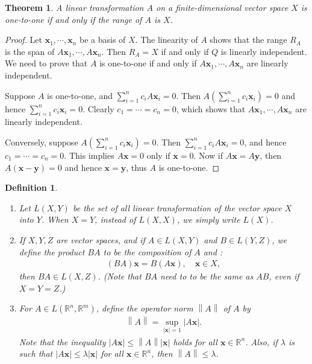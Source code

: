 \documentclass[10pt]{book}
\newtheorem{definition}{Definition}[chapter]
\newtheorem{theorem}{Theorem}[chapter]
\theoremstyle{definition}
\numberwithin{equation}{chapter}
\begin{document}
\medskip

\begin{theorem}\label{th_71}
A linear transformation $A$ on a finite-dimensional vector space $X$ is one-to-one if and only if the range of $A$ is $X$.
\end{theorem}
\begin{proof}
Let $\mathbf{x}_1, \cdots, \mathbf{x}_n$ be a basis of $X$. The linearity of $A$ shows that the range $R_A$ is the span of $A\mathbf{x}_1, \cdots, A\mathbf{x}_n$. Then $R_A = X$ if and only if $Q$ is linearly independent. We need to prove that $A$ is one-to-one if and only if $A\mathbf{x}_1, \cdots, A\mathbf{x}_n$ are linearly independent.

Suppose $A$ is one-to-one, and $\sum^n_{i=1} c_i A \mathbf{x}_i = 0$. Then $A \left(\sum^n_{i=1} c_i \mathbf{x}_i\right) = 0$ and hence $\sum^n_{i=1} c_i \mathbf{x}_i = 0$. Clearly $c_1 = \cdots = c_n = 0$, which shows that $A\mathbf{x}_1, \cdots, A\mathbf{x}_n$ are linearly independent.

Conversely, suppose $A \left(\sum^n_{i=1} c_i \mathbf{x}_i\right) = 0$. Then $\sum^n_{i=1} c_i A \mathbf{x}_i = 0$, and hence $c_1 = \cdots = c_n = 0$. This implies $A\mathbf{x} = 0$ only if $\mathbf{x} = 0$. Now if $A\mathbf{x} = A\mathbf{y}$, then $A(\mathbf{x} - \mathbf{y}) = 0$ and hence $\mathbf{x} = \mathbf{y}$, thus $A$ is one-to-one.
\end{proof}

\medskip

\begin{definition}\label{def_74}
~\begin{enumerate}[label=(\alph*)]
    \item Let $L(X,Y)$ be the set of all linear transformation of the vector space $X$ into $Y$. When $X = Y$, instead of $L(X,X)$, we simply write $L(X)$. 
    
    \item If $X,Y,Z$ are vector spaces, and if $A \in L(X,Y)$ and $B \in L(Y,Z)$, we define the product $BA$ to be the composition of $A$ and :
    \begin{align*}
        (BA)\mathbf{x} = B(A\mathbf{x}), \quad \mathbf{x} \in X,
    \end{align*}
    then $BA \in L(X,Z)$. (Note that $BA$ need to to be the same as $AB$, even if $X = Y = Z$.)
    
    \item For $A \in L(\mathbb{R}^n,\mathbb{R}^m)$, define the operator norm $\left\|A\right\|$ of $A$ by
    \begin{align*}
        \left\|A\right\| = \sup_{\left|\mathbf{x}\right|=1} \left|A\mathbf{x}\right|.
    \end{align*}
    Note that the inequality $\left|A\mathbf{x}\right| \leq \left\|A\right\| \left|\mathbf{x}\right|$ holds for all $\mathbf{x} \in \mathbb{R}^n$. Also, if $\lambda$ is such that $\left|A\mathbf{x}\right| \leq \lambda \left|\mathbf{x}\right|$ for all $\mathbf{x} \in \mathbb{R}^n$, then $\left\|A\right\| \leq \lambda$.
\end{enumerate}
\end{definition}
\end{document}
